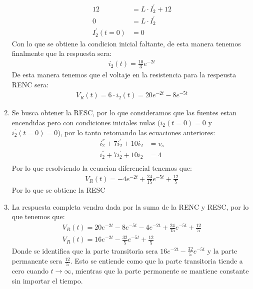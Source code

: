 \documentclass[
  11pt,
  letterpaper,
   addpoints,
   answers
  ]{exam}
\begin{document}
\begin{questions}
\begin{solution}
\begin{enumerate}
\begin{align}
            12 &= L \cdot I_{2}^{'} + 12\\
            0 &= L \cdot I_{2}^{'}\\
            I_{2}^{'}(t=0) &= 0
        \end{align}
        Con lo que se obtiene la condicion inicial faltante, de esta manera tenemos finalmente que la respuesta sera:
        \begin{align}
            i_{2}(t) = \frac{10}{3}e^{-2t}
        \end{align}
        De esta manera tenemos que el voltaje en la resistencia para la respeusta RENC sera:
        \begin{align}
            V_{R}(t) = 6 \cdot i_{2}(t) = 20e^{-2t} - 8e^{-5t}
        \end{align}
        \item  Se busca obtener la RESC, por lo que consideramos que las fuentes estan encendidas pero con condiciones iniciales nulas ($i_{2}(t=0) = 0$ y $i_{2}^{'}(t=0)=0$), por lo tanto retomando las ecuaciones anteriores:
        \begin{align}
            i_{2}^{''} + 7i_{2}^{'} + 10i_{2} &= v_{s}\\
            i_{2}^{''} + 7i_{2}^{'} + 10i_{2} &= 4\\
        \end{align}
        Por lo que resolviendo la ecuacion diferencial tenemos que:
        \begin{align}
            V_{R}(t) = -4e^{-2t} + \frac{24}{15}e^{-5t} + \frac{12}{5}
        \end{align}
        Por lo que se obtiene la RESC
        \item La respuesta completa vendra dada por la suma de la RENC y RESC, por lo que tenemos que:
        \begin{align}
            V_{R}(t) = 20e^{-2t} - 8e^{-5t} -4e^{-2t} + \frac{24}{15}e^{-5t} + \frac{12}{5}\\
            V_{R}(t) = 16e^{-2t} - \frac{32}{5}e^{-5t} + \frac{12}{5}
        \end{align}
        Donde se identifica que la parte transitoria sera $16e^{-2t} - \frac{32}{5}e^{-5t}$ y la parte permanente sera $\frac{12}{5}$. Esto se entiende como que la parte transitoria tiende a cero cuando $t \to \infty$, mientras que la parte permanente se mantiene constante sin importar el tiempo.
    \end{enumerate}
\end{solution}
\end{questions}
\end{document}
